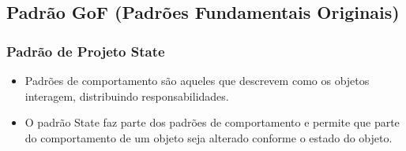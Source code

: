 \subsection{Padrão GoF (Padrões Fundamentais Originais)}

\begin{frame}
	\frametitle{Padrão de Projeto State}
	\begin{itemize}
		\item Padrões de comportamento são aqueles que descrevem como os objetos interagem, distribuindo responsabilidades.	
		\item O padrão State faz parte dos padrões de comportamento e permite que parte do comportamento de um objeto seja alterado conforme o estado do objeto.		
	\end{itemize}
\end{frame}




